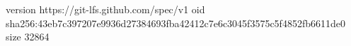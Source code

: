 version https://git-lfs.github.com/spec/v1
oid sha256:43eb7c397207e9936d27384693fba42412c7e6c3045f3575c5f4852fb6611de0
size 32864
